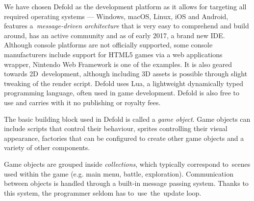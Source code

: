\documentclass[thesis=B,english,hidelinks]{FITthesisXE}[2012/06/26]
\begin{document}
\begin{table}[]
\centering
\caption{Comparison of game engines}
\label{engine-comparison}
\end{table}

\newpage

We have chosen Defold as the development platform as it allows for targeting all required operating systems --- Windows, macOS, Linux, iOS and Android, features a~\emph{message-driven architecture} that is very easy to comprehend and build around, has an active community and as of early 2017, a brand new IDE. Although console platforms are not officially supported, some console manufacturers include support for HTML5 games via a web applications wrapper, Nintendo Web Framework\autocite{nintendoweb} is one of the examples. It is also geared towards 2D~development, although including 3D assets is possible through slight tweaking of the render script. Defold uses Lua, a lightweight dynamically typed programming language, often used in game development. Defold is also free to use and carries with it no publishing or royalty fees.

The basic building block used in Defold is called a \emph{game object}. Game objects can include scripts that control their behaviour, sprites controlling their visual appearance, factories that can be configured to create other game objects and a variety of other components\autocite{defoldblocks}.

Game objects are grouped inside \emph{collections}, which typically correspond to~scenes used within the game (e.g. main menu, battle, exploration). Communication between objects is handled through a built-in message passing system. Thanks to this system, the programmer seldom has to~use~the~update loop.
\end{document}
